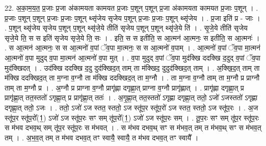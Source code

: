 \documentclass[17pt]{extarticle}
\begin{document}
22. अ॒का॒म॒य॒त॒ प्र॒जाः प्र॒जा अ॑कामयता कामयत प्र॒जाः प॒शून् प॒शून् प्र॒जा अ॑कामयता कामयत प्र॒जाः प॒शून् । . प्र॒जाः प॒शून् प॒शून् प्र॒जाः प्र॒जाः प॒शून् थ्सृ॑जेय सृजेय प॒शून् प्र॒जाः प्र॒जाः प॒शून् थ्सृ॑जेय । . प्र॒जा इति॑ प्र - जाः । . प॒शून् थ्सृ॑जेय सृजेय प॒शून् प॒शून् थ्सृ॑जे॒ये तीति॑ सृजेय प॒शून् प॒शून् थ्सृ॑जे॒ये ति॑ । . सृ॒जे॒ये तीति॑ सृजेय सृजे॒ये ति॒ स स इति॑ सृजेय सृजे॒ये ति॒ सः । . इति॒ स स इतीति॒ स आ॒त्मन॑ आ॒त्मनः॒ स इतीति॒ स आ॒त्मनः॑ । . स आ॒त्मन॑ आ॒त्मनः॒ स स आ॒त्मनो॑ व॒पां ॅव॒पा मा॒त्मनः॒ स स आ॒त्मनो॑ व॒पाम् । . आ॒त्मनो॑ व॒पां ॅव॒पा मा॒त्मन॑ आ॒त्मनो॑ व॒पा मुदुद् व॒पा मा॒त्मन॑ आ॒त्मनो॑ व॒पा मुत् । . व॒पा मुदुद् व॒पां ॅव॒पा मुद॑क्खि ददक्खि द॒दुद् व॒पां ॅव॒पा मुद॑क्खिदत् । . उद॑क्खि ददक्खि द॒दु दुद॑क्खिद॒त् ताम् ता म॑क्खिद॒ दुदुद॑क्खिद॒त् ताम् । . अ॒क्खि॒द॒त् ताम् ता म॑क्खि ददक्खिद॒त् ता म॒ग्ना व॒ग्नौ ता म॑क्खि ददक्खिद॒त् ता म॒ग्नौ । . ता म॒ग्ना व॒ग्नौ ताम् ता म॒ग्नौ प्र प्राग्नौ ताम् ता म॒ग्नौ प्र । . अ॒ग्नौ प्र प्राग्ना व॒ग्नौ प्रागृ॑ह्णा दगृह्णा॒त् प्राग्ना व॒ग्नौ प्रागृ॑ह्णात् । . प्रागृ॑ह्णा दगृह्णा॒त् प्र प्रागृ॑ह्णा॒त् तत॒स्ततो॑ ऽगृह्णा॒त् प्र प्रागृ॑ह्णा॒त् ततः॑ । . अ॒गृ॒ह्णा॒त् तत॒स्ततो॑ ऽगृह्णा दगृह्णा॒त् ततो॒ ऽजो॑ ऽजस्ततो॑ ऽगृह्णा दगृह्णा॒त् ततो॒ ऽजः । . ततो॒ ऽजो॑ ऽज स्तत॒ स्ततो॒ ऽज स्तू॑प॒र स्तू॑प॒रो॑ ऽज स्तत॒ स्ततो॒ ऽज स्तू॑प॒रः । . अ॒ज स्तू॑प॒र स्तू॑प॒रो᳚(1॒) ऽजो॑ ऽज स्तू॑प॒रः सꣳ सम् तू॑प॒रो᳚(1॒) ऽजो॑ ऽज स्तू॑प॒रः सम् । . तू॒प॒रः सꣳ सम् तू॑प॒र स्तू॑प॒रः स म॑भव दभव॒थ् सम् तू॑प॒र स्तू॑प॒रः स म॑भवत् । . स म॑भव दभव॒थ् सꣳ स म॑भव॒त् तम् त म॑भव॒थ् सꣳ स म॑भव॒त् तम् । . अ॒भ॒व॒त् तम् त म॑भव दभव॒त् तꣳ स्वायै॒ स्वायै॒ त म॑भव दभव॒त् तꣳ स्वायै᳚ । \newline
\end{document}

